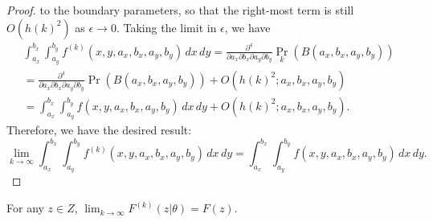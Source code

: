 \begin{proof}
  to the boundary parameters, so that the right-most term is still
  $O(h(k)^2)$ as $\epsilon \to 0$. Taking the limit in $\epsilon$, we have
  \begin{align*}
    \displaystyle \int_{a_x}^{b_x} \displaystyle \int_{a_y}^{b_y}
    f^{(k)}(x,y,a_x,b_x,a_y,b_y)\, dx\, dy =
    \frac{\partial^4}{\partial a_x \partial b_x \partial a_y \partial
    b_y} \Pr_k(B(a_x, b_x, a_y, b_y)) \\
    = \frac{\partial^4}{\partial
      a_x \partial b_x \partial a_y \partial b_y} \Pr(B(a_x, b_x, a_y,
    b_y)) +  O(h(k)^2; a_x, b_x, a_y, b_y) \\
    =\displaystyle \int_{a_x}^{b_x} \displaystyle \int_{a_y}^{b_y}
    f(x,y,a_x,b_x,a_y,b_y)\, dx\, dy + O(h(k)^2; a_x, b_x, a_y, b_y).
  \end{align*}
  Therefore, we have the desired result:
  \[
    \lim_{k\to \infty} \displaystyle \int_{a_x}^{b_x} \displaystyle
    \int_{a_y}^{b_y} f^{(k)}(x,y,a_x,b_x,a_y,b_y)\, dx\,dy =
    \displaystyle \int_{a_x}^{b_x} \displaystyle \int_{a_y}^{b_y}
    f(x,y,a_x,b_x,a_y,b_y)\, dx\,dy.
  \]
\end{proof}

\begin{lemma} \label{lem:conv-dist}
  For any $z \in Z$,
  $ \lim_{k \to \infty} F^{(k)}(z | \theta) = F(z).$

\end{lemma}


